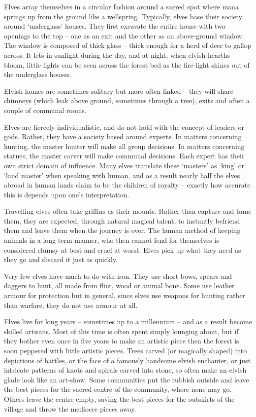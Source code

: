 \documentclass[titlepage,a4paper,openany]{book}
\begin{document}
\begin{multicols}{2}

Elves array themselves in a circular fashion around a sacred spot where mana springs up from the ground like a wellspring.
Typically, elves base their society around `underglass' houses. They first excavate the entire house with two openings to the top -- one as an exit and the other as an above-ground window. The window is composed of thick glass -- thick enough for a herd of deer to gallop across. It lets in sunlight during the day, and at night, when elvish hearths bloom, little lights can be seen across the forest bed as the fire-light shines out of the underglass houses.

Elvish homes are sometimes solitary but more often linked -- they will share chimneys (which leak above ground, sometimes through a tree), exits and often a couple of communal rooms.

Elves are fiercely individualistic, and do not hold with the concept of leaders or gods. Rather, they have a society based around experts. In matters concerning hunting, the master hunter will make all group decisions. In matters concerning statues, the master carver will make communal decisions. Each expert has their own strict domain of influence. Many elves translate these `masters' as `king' or `land master' when speaking with human, and as a result nearly half the elves abroad in human lands claim to be the children of royalty -- exactly how accurate this is depends upon one's interpretation.

Travelling elves often take griffins as their mounts. Rather than capture and tame them, they are expected, through natural magical talent, to instantly befriend them and leave them when the journey is over. The human method of keeping animals in a long-term manner, who then cannot fend for themselves is considered clumsy at best and cruel at worst. Elves pick up what they need as they go and discard it just as quickly.

Very few elves have much to do with iron. They use short bows, spears and daggers to hunt, all made from flint, wood or animal bone. Some use leather armour for protection but in general, since elves use weapons for hunting rather than warfare, they do not use armour at all.

Elves live for long years -- sometimes up to a millennium -- and as a result become skilled artisans. Most of this time is often spent simply lounging about, but if they bother even once in five years to make an artistic piece then the forest is soon peppered with little artistic pieces. Trees carved (or magically shaped) into depictions of battles, or the face of a famously handsome elvish enchanter, or just intricate patterns of knots and spirals carved into stone, so often make an elvish glade look like an art-show. Some communities put the rubbish outside and leave the best pieces for the sacred centre of the community, where none may go. Others leave the centre empty, saving the best pieces for the outskirts of the village and throw the mediocre pieces away.


\end{multicols}
\end{document}
